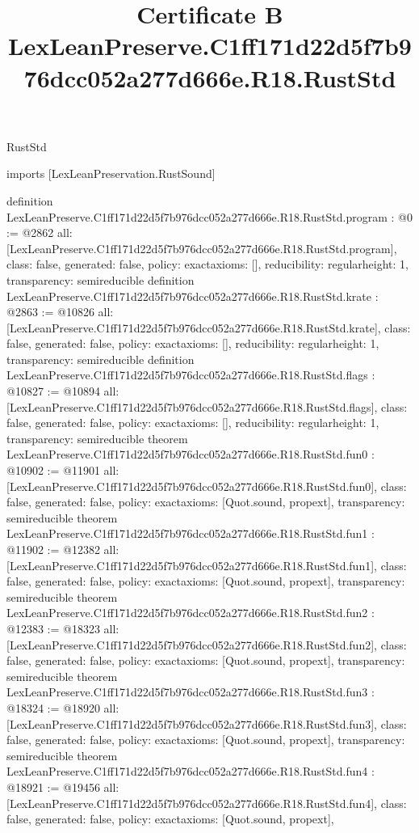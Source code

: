 \begin{lexlean}{RustStd}
\title{Certificate B LexLeanPreserve.C1ff171d22d5f7b976dcc052a277d666e.R18.RustStd}
\begin{coremodule}
imports [LexLeanPreservation.RustSound]

definition LexLeanPreserve.C1ff171d22d5f7b976dcc052a277d666e.R18.RustStd.program : @0 := @2862 {
  all: [LexLeanPreserve.C1ff171d22d5f7b976dcc052a277d666e.R18.RustStd.program],
  class: false,
  generated: false,
  policy: exact{axioms: []},
  reducibility: regular{height: 1},
  transparency: semireducible
}
definition LexLeanPreserve.C1ff171d22d5f7b976dcc052a277d666e.R18.RustStd.krate : @2863 := @10826 {
  all: [LexLeanPreserve.C1ff171d22d5f7b976dcc052a277d666e.R18.RustStd.krate],
  class: false,
  generated: false,
  policy: exact{axioms: []},
  reducibility: regular{height: 1},
  transparency: semireducible
}
definition LexLeanPreserve.C1ff171d22d5f7b976dcc052a277d666e.R18.RustStd.flags : @10827 := @10894 {
  all: [LexLeanPreserve.C1ff171d22d5f7b976dcc052a277d666e.R18.RustStd.flags],
  class: false,
  generated: false,
  policy: exact{axioms: []},
  reducibility: regular{height: 1},
  transparency: semireducible
}
theorem LexLeanPreserve.C1ff171d22d5f7b976dcc052a277d666e.R18.RustStd.fun0 : @10902 := @11901 {
  all: [LexLeanPreserve.C1ff171d22d5f7b976dcc052a277d666e.R18.RustStd.fun0],
  class: false,
  generated: false,
  policy: exact{axioms: [Quot.sound, propext]},
  transparency: semireducible
}
theorem LexLeanPreserve.C1ff171d22d5f7b976dcc052a277d666e.R18.RustStd.fun1 : @11902 := @12382 {
  all: [LexLeanPreserve.C1ff171d22d5f7b976dcc052a277d666e.R18.RustStd.fun1],
  class: false,
  generated: false,
  policy: exact{axioms: [Quot.sound, propext]},
  transparency: semireducible
}
theorem LexLeanPreserve.C1ff171d22d5f7b976dcc052a277d666e.R18.RustStd.fun2 : @12383 := @18323 {
  all: [LexLeanPreserve.C1ff171d22d5f7b976dcc052a277d666e.R18.RustStd.fun2],
  class: false,
  generated: false,
  policy: exact{axioms: [Quot.sound, propext]},
  transparency: semireducible
}
theorem LexLeanPreserve.C1ff171d22d5f7b976dcc052a277d666e.R18.RustStd.fun3 : @18324 := @18920 {
  all: [LexLeanPreserve.C1ff171d22d5f7b976dcc052a277d666e.R18.RustStd.fun3],
  class: false,
  generated: false,
  policy: exact{axioms: [Quot.sound, propext]},
  transparency: semireducible
}
theorem LexLeanPreserve.C1ff171d22d5f7b976dcc052a277d666e.R18.RustStd.fun4 : @18921 := @19456 {
  all: [LexLeanPreserve.C1ff171d22d5f7b976dcc052a277d666e.R18.RustStd.fun4],
  class: false,
  generated: false,
  policy: exact{axioms: [Quot.sound, propext]},
}
\end{coremodule}
\end{lexlean}
